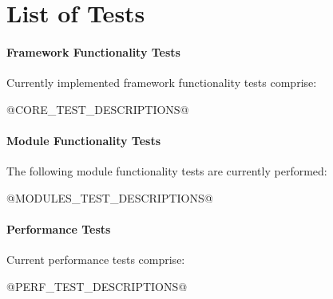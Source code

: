\section{List of Tests}
\label{app:testlist}

\paragraph{Framework Functionality Tests}

Currently implemented framework functionality tests comprise:

\begin{description}
    @CORE_TEST_DESCRIPTIONS@
\end{description}


\paragraph{Module Functionality Tests}

The following module functionality tests are currently performed:

\begin{description}
    @MODULES_TEST_DESCRIPTIONS@
\end{description}


\paragraph{Performance Tests}

Current performance tests comprise:

\begin{description}
    @PERF_TEST_DESCRIPTIONS@
\end{description}
